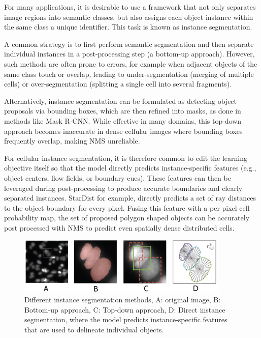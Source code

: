 For many applications, it is desirable to use a framework that not only separates image regions into semantic classes, but also assigns each object instance within the same class a unique identifier. This task is known as instance segmentation.

A common strategy is to first perform semantic segmentation and then separate individual instances in a post-processing step (a bottom-up approach). However, such methods are often prone to errors, for example when adjacent objects of the same class touch or overlap, leading to under-segmentation (merging of multiple cells) or over-segmentation (splitting a single cell into several fragments).

Alternatively, instance segmentation can be formulated as detecting object proposals via bounding boxes, which are then refined into masks, as done in methods like Mask R-CNN. While effective in many domains, this top-down approach becomes inaccurate in dense cellular images where bounding boxes frequently overlap, making NMS unreliable.

For cellular instance segmentation, it is therefore common to edit the learning objective itself so that the model directly predicts instance-specific features (e.g., object centers, flow fields, or boundary cues). These features can then be leveraged during post-processing to produce accurate boundaries and clearly separated instances. StarDist for example, directly predicts a set of ray distances to the object boundary for every pixel. Fusing this feature with a per pixel cell probability map, the set of proposed polygon shaped objects can be accurately post processed with NMS to predict even spatially dense distributed cells.

\begin{figure}[!ht]
    \centering
    \includegraphics[width=0.9\textwidth]{Images/SOTA/stardist.png}
    \caption{Different instance segmentation methods, A: original image, B: Bottom-up approach, C: Top-down approach, D: Direct instance segmentation, where the model predicts instance-specific features that are used to delineate individual objects.}
    \label{fig:StarDist}
\end{figure}

